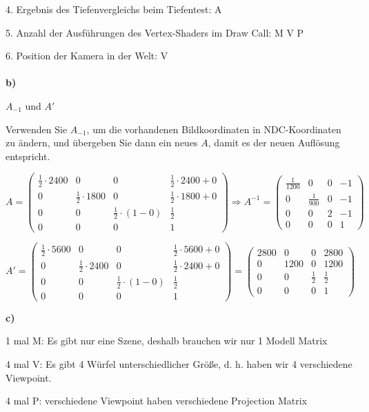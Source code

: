 \documentclass[fleqn]{article}
\begin{document}
4.  Ergebnis des Tiefenvergleichs beim Tiefentest: A

5.  Anzahl der Ausführungen des Vertex-Shaders im Draw Call: M V P

6.  Position der Kamera in der Welt: V
\\
\\
\noindent\textbf{b)}

$A_{-1}$ und $A'$

Verwenden Sie $A_{-1}$, um die vorhandenen Bildkoordinaten in NDC-Koordinaten zu ändern,
 und übergeben Sie dann ein neues $A$, damit es der neuen Auflösung entspricht.

$A=\begin{pmatrix}
    \frac{1}{2}\cdot 2400&0&0&\frac{1}{2}\cdot 2400+0\\
    0&\frac{1}{2}\cdot 1800&0& \frac{1}{2}\cdot 1800+0\\
    0&0&\frac{1}{2}\cdot(1-0)&\frac{1}{2}\\
    0&0&0&1
\end{pmatrix}\Rightarrow A^{-1}=\begin{pmatrix}
    \frac{1}{1200}&0&0&-1\\
    0&\frac{1}{900}&0&-1\\
    0&0&2&-1\\
    0&0&0&1
\end{pmatrix}$

$A'=\begin{pmatrix}
    \frac{1}{2}\cdot 5600&0&0&\frac{1}{2}\cdot 5600+0\\
    0&\frac{1}{2}\cdot 2400&0& \frac{1}{2}\cdot 2400+0\\
    0&0&\frac{1}{2}\cdot(1-0)&\frac{1}{2}\\
    0&0&0&1
\end{pmatrix}=\begin{pmatrix}
    2800&0&0&2800\\
    0&1200&0& 1200\\
    0&0&\frac{1}{2}&\frac{1}{2}\\
    0&0&0&1
\end{pmatrix}$

\noindent\textbf{c)}

1 mal M: Es gibt nur eine Szene, deshalb brauchen wir nur 1 Modell Matrix

4 mal V: Es gibt 4 Würfel unterschiedlicher Größe, d. h. haben wir 4 verschiedene Viewpoint.

4 mal P: verschiedene Viewpoint haben verschiedene Projection Matrix
\end{document}
